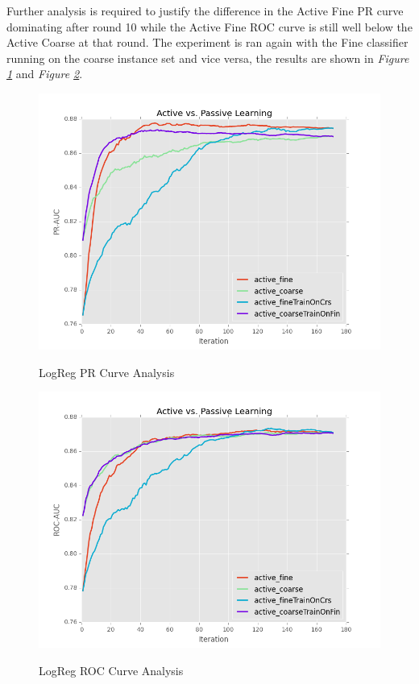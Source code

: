 \documentclass[ms]{nuthesis}
\begin{document}
\par Further analysis is required to justify the difference in the Active Fine PR curve
dominating after round 10 while the Active Fine ROC curve is still well below the
 Active Coarse at that round. The experiment is ran again with the Fine classifier
  running on the coarse instance set and vice versa, the results are shown in
  \textit{Figure \ref{fig:resultsrunActPassLogReg4plots_pr}} and
  \textit{Figure \ref{fig:resultsrunActPassLogReg4plots_roc}}.

\begin{figure}[!htb]
	\centering
    \includegraphics[width=1.0\columnwidth]{fig/resultsrunActPassLogReg4plots_pr}
    \label{fig:resultsrunActPassLogReg4plots_pr}
    \caption{LogReg PR Curve Analysis}
\end{figure}
\FloatBarrier

\begin{figure}[!htb]
	\centering
    \includegraphics[width=1.0\columnwidth]{fig/resultsrunActPassLogReg4plots_roc}
    \label{fig:resultsrunActPassLogReg4plots_roc}
    \caption{LogReg ROC Curve Analysis}
\end{figure}
\FloatBarrier
\end{document}
